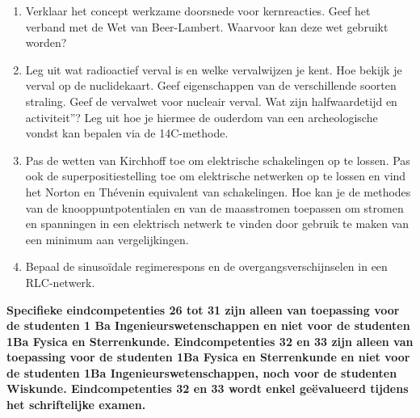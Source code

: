 \documentclass[12pt]{article}
\begin{document}
\begin{enumerate}
        \item Verklaar het concept werkzame doorsnede voor kernreacties. Geef het verband met de Wet van Beer-Lambert. Waarvoor kan deze wet gebruikt worden?
        \item Leg uit wat radioactief verval is en welke vervalwijzen je kent. Hoe bekijk je verval op de nuclidekaart. Geef eigenschappen van de verschillende soorten straling. Geef de vervalwet voor nucleair verval. Wat zijn halfwaardetijd en activiteit”? Leg uit hoe je hiermee de ouderdom van een archeologische vondst kan bepalen via de 14C-methode.
        \item Pas de wetten van Kirchhoff toe om elektrische schakelingen op te lossen. Pas ook de superpositiestelling toe om elektrische netwerken op te lossen en vind het Norton en Thévenin equivalent van schakelingen. Hoe kan je de methodes van de knooppuntpotentialen en van de maasstromen toepassen om stromen en spanningen in een elektrisch netwerk te vinden door gebruik te maken van een minimum aan vergelijkingen.
        \item Bepaal de sinusoïdale regimerespons en de overgangsverschijnselen in een RLC-netwerk.
    \end{enumerate}
    {\bf Specifieke eindcompetenties 26 tot 31 zijn alleen van toepassing voor de studenten 1 Ba Ingenieurswetenschappen en niet voor de studenten 1Ba Fysica en Sterrenkunde. Eindcompetenties 32 en 33 zijn alleen van toepassing voor de studenten 1Ba Fysica en Sterrenkunde en niet voor de studenten 1Ba Ingenieurswetenschappen, noch voor de studenten Wiskunde. Eindcompetenties 32 en 33 wordt enkel geëvalueerd tijdens het schriftelijke examen.}
\end{document}
